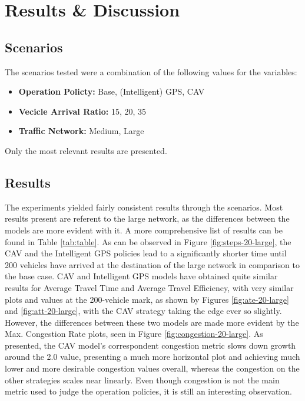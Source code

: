 \section{Results \& Discussion}
\label{sec:Results-Discussion}

\subsection{Scenarios}

The scenarios tested were a combination of the following values for the variables:

\begin{itemize}
    \item \textbf{Operation Policty:} Base, (Intelligent) GPS, CAV
    \item \textbf{Vecicle Arrival Ratio:} 15, 20, 35
    \item \textbf{Traffic Network:} Medium, Large
\end{itemize}

Only the most relevant results are presented.

\subsection{Results}

The experiments yielded fairly consistent results through the scenarios. Most results present are referent to the large network, as the differences between the models are more evident with it. A more comprehensive list of results can be found in Table \ref{tab:table}. As can be observed in Figure \ref{fig:steps-20-large}, the CAV and the Intelligent GPS policies lead to a significantly shorter time until 200 vehicles have arrived at the destination of the large network in comparison to the base case. 
CAV and Intelligent GPS models have obtained quite similar results for Average Travel Time and Average Travel Efficiency, with very similar plots and values at the 200-vehicle mark, as shown by Figures \ref{fig:ate-20-large} and \ref{fig:att-20-large}, with the CAV strategy taking the edge ever so slightly. However, the differences between these two models are made more evident by the Max. Congestion Rate plots, seen in Figure \ref{fig:congestion-20-large}. As presented, the CAV model's correspondent congestion metric slows down growth around the 2.0 value, presenting a much more horizontal plot and achieving much lower and more desirable congestion values overall, whereas the congestion on the other strategies scales near linearly. Even though congestion is not the main metric used to judge the operation policies, it is still an interesting observation. 

